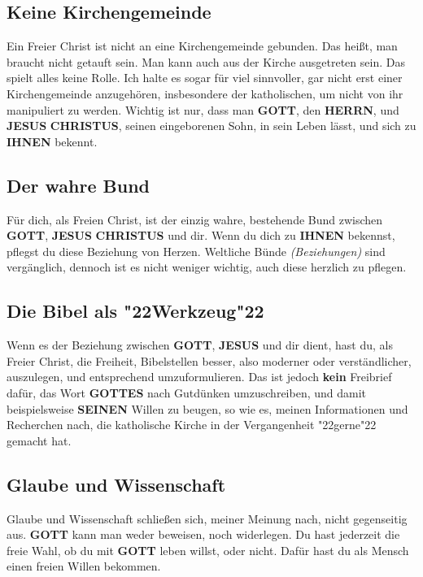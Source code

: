 \documentclass[10pt,a5paper]{article}
\newcommand{\Christus}[0]{\textbf{CHRISTUS}}
\newcommand{\Gottes}[0]{\textbf{GOTTES}}
\newcommand{\Gott}[0]{\textbf{GOTT}}
\newcommand{\Herrn}[0]{\textbf{HERRN}}
\newcommand{\Ihnen}[0]{\textbf{IHNEN}}
\newcommand{\Jesus}[0]{\textbf{JESUS}}
\newcommand{\Seinen}[0]{\textbf{SEINEN}}
\newcommand{\q}[1]{\char"22{#1}\char"22 }
\begin{document}
	\subsection{Keine Kirchengemeinde}
		Ein Freier Christ ist nicht an eine Kirchengemeinde gebunden.
		Das hei{\ss}t,
		man braucht nicht getauft sein.
		Man kann auch aus der Kirche ausgetreten sein.
		Das spielt alles keine Rolle.
		Ich halte es sogar f\"ur viel sinnvoller,
		gar nicht erst einer Kirchengemeinde anzugeh\"oren,
		insbesondere der katholischen,
		um nicht von ihr manipuliert zu werden.
		Wichtig ist nur,
		dass man {\Gott},
		den {\Herrn},
		und {\Jesus} {\Christus},
		seinen eingeborenen Sohn,
		in sein Leben l\"asst,
		und sich zu {\Ihnen} bekennt.
	
	\subsection{Der wahre Bund}
		F\"ur dich,
		als Freien Christ,
		ist der einzig wahre,
		bestehende Bund zwischen {\Gott},
		{\Jesus} {\Christus} und dir.
		Wenn du dich zu {\Ihnen} bekennst,
		pflegst du diese Beziehung von Herzen.
		Weltliche B\"unde \textit{(Beziehungen)} sind verg\"anglich,
		dennoch ist es nicht weniger wichtig,
		auch diese herzlich zu pflegen.
	
	\subsection{Die Bibel als \q{Werkzeug}}
		Wenn es der Beziehung zwischen {\Gott},
		{\Jesus} und dir dient,
		hast du,
		als Freier Christ,
		die Freiheit,
		Bibelstellen besser,
		also moderner oder verst\"andlicher,
		auszulegen,
		und entsprechend umzuformulieren.
		Das ist jedoch \textbf{kein} Freibrief daf\"ur,
		das Wort {\Gottes} nach Gutdünken umzuschreiben,
		und damit beispielsweise {\Seinen} Willen zu beugen,
		so wie es,
		meinen Informationen und Recherchen nach,
		die katholische Kirche in der Vergangenheit \q{gerne} gemacht hat.
	
	\subsection{Glaube und Wissenschaft}
		Glaube und Wissenschaft schlie{\ss}en sich,
		meiner Meinung nach,
		nicht gegenseitig aus.
		{\Gott} kann man weder beweisen,
		noch widerlegen.
		Du hast jederzeit die freie Wahl,
		ob du mit {\Gott} leben willst,
		oder nicht.
		Daf\"ur hast du als Mensch einen freien Willen bekommen.
	
\end{document}
